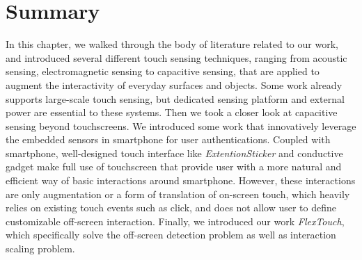 \section{Summary}
In this chapter, we walked through the body of literature related to our work, and introduced several different touch sensing techniques, ranging from acoustic sensing, electromagnetic sensing to capacitive sensing, that are applied to augment the interactivity of everyday surfaces and objects. Some work already supports large-scale touch sensing, but dedicated sensing platform and external power are essential to these systems. Then we took a closer look at capacitive sensing beyond touchscreens. We introduced some work that innovatively leverage the embedded sensors in smartphone for user authentications. Coupled with smartphone, well-designed touch interface like \textit{ExtentionSticker} and conductive gadget make full use of touchscreen that provide user with a more natural and efficient way of basic interactions around smartphone. However, these interactions are only augmentation or a form of translation of on-screen touch, which heavily relies on existing touch events such as click, and does not allow user to define customizable off-screen interaction. Finally, we introduced our work \textit{FlexTouch}, which specifically solve the off-screen detection problem as well as interaction scaling problem.